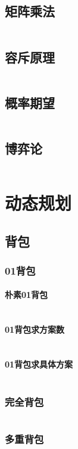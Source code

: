 \documentclass[a4paper,12pt]{article}
\begin{document}
\subsection{矩阵乘法}
\inputminted[breaklines, linenos]{c++}{math/matrix.cc}
\subsection{容斥原理}
\inputminted[breaklines, linenos]{c++}{math/rongchi.cc}
\subsection{概率期望}
\inputminted[breaklines, linenos]{c++}{math/qiwang.cc}
\subsection{博弈论}
\inputminted[breaklines, linenos]{c++}{math/game.cc}

\newpage
\section{动态规划}
\subsection{背包}
\subsubsection{01背包}
\paragraph{朴素01背包}
\inputminted[breaklines, linenos]{c++}{dp/bag/01.cc}
\paragraph{01背包求方案数}
\inputminted[breaklines, linenos]{c++}{dp/bag/sum.cc}
\paragraph{01背包求具体方案}
\inputminted[breaklines, linenos]{c++}{dp/bag/01_way.cc}
\subsubsection{完全背包}
\inputminted[breaklines, linenos]{c++}{dp/bag/comp.cc}
\subsubsection{多重背包}
\inputminted[breaklines, linenos]{c++}{dp/bag/mul.cc}
\end{document}
